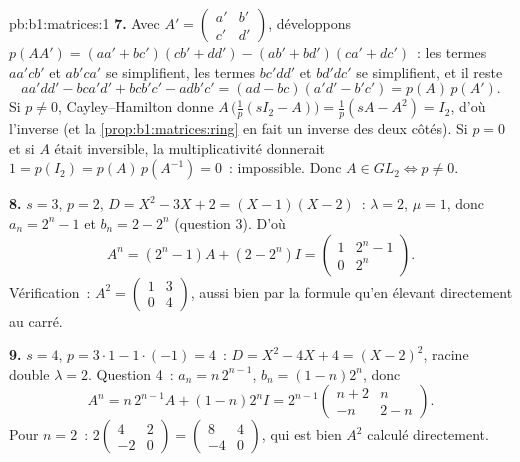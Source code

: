 \begin{solution}{pb:b1:matrices:1}
\textbf{7.} Avec $A' = \begin{pmatrix} a' & b'\\ c' &
d'\end{pmatrix}$, développons $p(AA') = (aa' + bc')(cb' + dd') -
(ab' + bd')(ca' + dc')$~: les termes $aa'cb'$ et $ab'ca'$ se
simplifient, les termes $bc'dd'$ et $bd'dc'$ se simplifient, et il
reste
\[
aa'dd' - bca'd' + bcb'c' - adb'c'
= (ad - bc)(a'd' - b'c') = p(A)\,p(A').
\]
Si $p \neq 0$, Cayley--Hamilton donne $A\,\bigl(\tfrac1p(sI_2 -
A)\bigr) = \tfrac1p(sA - A^2) = I_2$, d'où l'inverse (et la
\cref{prop:b1:matrices:ring} en fait un inverse des deux côtés). Si $p
= 0$ et si $A$ était inversible, la multiplicativité donnerait $1 =
p(I_2) = p(A)\,p(A^{-1}) = 0$~: impossible. Donc $A \in GL_2 \iff p
\neq 0$.

\textbf{8.} $s = 3$, $p = 2$, $D = X^2 - 3X + 2 = (X - 1)(X -
2)$~: $\lambda = 2$, $\mu = 1$, donc $a_n = 2^n - 1$ et $b_n = 2 -
2^n$ (question 3). D'où
\[
A^n = (2^n - 1)A + (2 - 2^n)I
= \begin{pmatrix} 1 & 2^n - 1\\ 0 & 2^n \end{pmatrix}.
\]
Vérification~: $A^2 = \begin{pmatrix} 1 & 3\\ 0 & 4\end{pmatrix}$, aussi
bien par la formule qu'en élevant directement au carré.

\textbf{9.} $s = 4$, $p = 3\cdot1 - 1\cdot(-1) = 4$~: $D = X^2 -
4X + 4 = (X - 2)^2$, racine double $\lambda = 2$. Question 4~: $a_n
= n\,2^{n-1}$, $b_n = (1 - n)2^n$, donc
\[
A^n = n\,2^{n-1}A + (1 - n)2^n I
= 2^{n-1}\begin{pmatrix} n + 2 & n\\ -n & 2 - n
\end{pmatrix}.
\]
Pour $n = 2$~: $2\begin{pmatrix} 4 & 2\\ -2 & 0\end{pmatrix} =
\begin{pmatrix} 8 & 4\\ -4 & 0 \end{pmatrix}$, qui est bien $A^2$
calculé directement.


\end{solution}
